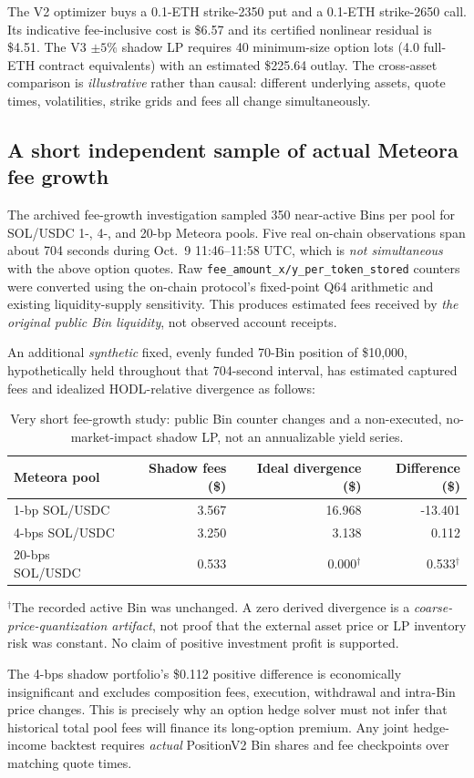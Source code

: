 The V2 optimizer buys a 0.1-ETH strike-2350 put and a 0.1-ETH strike-2650 call. Its indicative fee-inclusive cost is \$6.57 and its certified nonlinear residual is \$4.51. The V3 $\pm5\%$ shadow LP requires 40 minimum-size option lots (4.0 full-ETH contract equivalents) with an estimated \$225.64 outlay. The cross-asset comparison is \emph{illustrative} rather than causal: different underlying assets, quote times, volatilities, strike grids and fees all change simultaneously.

\subsection{A short independent sample of actual Meteora fee growth}
The archived fee-growth investigation sampled 350 near-active Bins per pool for SOL/USDC 1-, 4-, and 20-bp Meteora pools. Five real on-chain observations span about 704 seconds during Oct.\ 9 11:46--11:58 UTC, which is \emph{not simultaneous} with the above option quotes. Raw \texttt{fee\_amount\_x/y\_per\_token\_stored} counters were converted using the on-chain protocol's fixed-point Q64 arithmetic and existing liquidity-supply sensitivity. This produces estimated fees received by \emph{the original public Bin liquidity}, not observed account receipts.

An additional \emph{synthetic} fixed, evenly funded 70-Bin position of \$10,000, hypothetically held throughout that 704-second interval, has estimated captured fees and idealized HODL-relative divergence as follows:
\begin{table}[ht]
\centering
\caption{Very short fee-growth study: public Bin counter changes and a non-executed, no-market-impact shadow LP, not an annualizable yield series.}
\label{tab:fee}
\small
\begin{tabular}{@{}lrrr@{}}
\toprule
Meteora pool & Shadow fees (\$) & Ideal divergence (\$) & Difference (\$)\\
\midrule
1-bp SOL/USDC & 3.567 & 16.968 & -13.401\\
4-bps SOL/USDC & 3.250 & 3.138 & 0.112\\
20-bps SOL/USDC & 0.533 & 0.000$^\dagger$ & 0.533$^\dagger$\\
\bottomrule
\end{tabular}

\smallskip
\parbox{0.95\linewidth}{\footnotesize $^\dagger$The recorded active Bin was unchanged. A zero derived divergence is a \emph{coarse-price-quantization artifact}, not proof that the external asset price or LP inventory risk was constant. No claim of positive investment profit is supported.}
\end{table}

The 4-bps shadow portfolio's \$0.112 positive difference is economically insignificant and excludes composition fees, execution, withdrawal and intra-Bin price changes. This is precisely why an option hedge solver must not infer that historical total pool fees will finance its long-option premium. Any joint hedge-income backtest requires \emph{actual} PositionV2 Bin shares and fee checkpoints over matching quote times.
